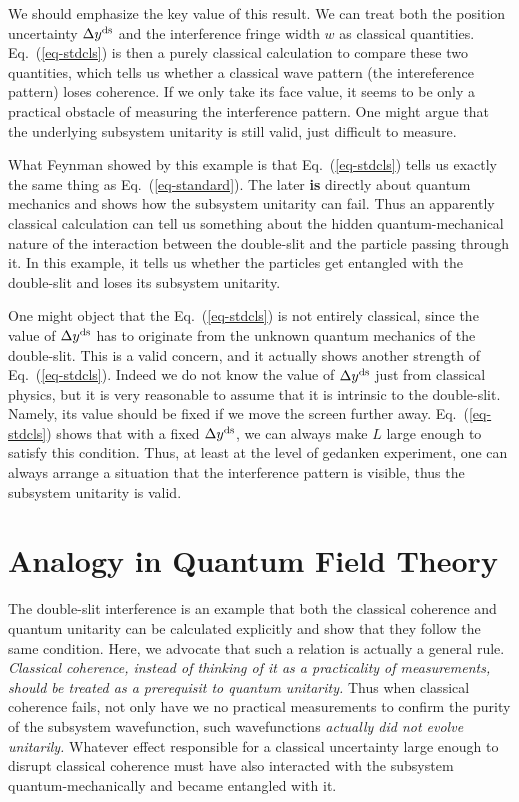 \documentclass[aps,showpacs,twocolumn,floats,prd,superscriptaddress,nofootinbib]{revtex4-1}
\begin{document}
We should emphasize the key value of this result. 
We can treat both the position uncertainty $\Delta y^{\rm ds}$ and the interference fringe width $w$ as classical quantities. Eq.~(\ref{eq-stdcls}) is then a purely classical calculation to compare these two quantities, which tells us whether a classical wave pattern (the intereference pattern) loses coherence. 
If we only take its face value, it seems to be only a practical obstacle of measuring the interference pattern. 
One might argue that the underlying subsystem unitarity is still valid, just difficult to measure. 

What Feynman showed by this example is that Eq.~(\ref{eq-stdcls}) tells us exactly the same thing as Eq.~(\ref{eq-standard}). 
The later {\bf is} directly about quantum mechanics and shows how the subsystem unitarity can fail. 
Thus an apparently classical calculation can tell us something about the hidden quantum-mechanical nature of the interaction between the double-slit and the particle passing through it. 
In this example, it tells us whether the particles get entangled with the double-slit and loses its subsystem unitarity. 

One might object that the Eq.~(\ref{eq-stdcls}) is not entirely classical, since the value of $\Delta y^{\rm ds}$ has to originate from the unknown quantum mechanics of the double-slit. 
This is a valid concern, and it actually shows another strength of Eq.~(\ref{eq-stdcls}). 
Indeed we do not know the value of $\Delta y^{\rm ds}$ just from classical physics, but it is very reasonable to assume that it is intrinsic to the double-slit. 
Namely, its value should be fixed if we move the screen further away. Eq.~(\ref{eq-stdcls}) shows that with a fixed $\Delta y^{\rm ds}$, we can always make $L$ large enough to satisfy this condition. 
Thus, at least at the level of gedanken experiment, one can always arrange a situation that the interference pattern is visible, thus the subsystem unitarity is valid.

\section{Analogy in Quantum Field Theory}
\label{sec-QFT}

The double-slit interference is an example that both the classical coherence and quantum unitarity can be calculated explicitly and show that they follow the same condition.
Here, we advocate that such a relation is actually a general rule.
{\it Classical coherence, instead of thinking of it as a practicality of measurements, should be treated as a prerequisit to quantum unitarity.} 
Thus when classical coherence fails, not only have we no practical measurements to confirm the purity of the subsystem wavefunction, such wavefunctions {\it actually did not evolve unitarily.}
Whatever effect responsible for a classical uncertainty large enough to disrupt classical coherence must have also interacted with the subsystem quantum-mechanically and became entangled with it.
\end{document}
